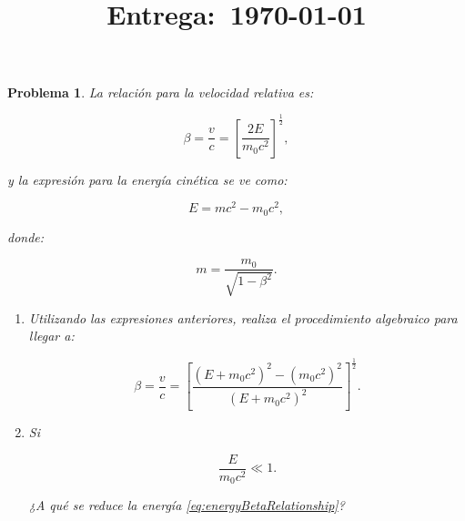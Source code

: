 \documentclass[12pt]{article}
\title{
    \textbf{\homeworknumber}\\
    \normalsize\vspace{0.1in}\small{\textbf{Entrega}:~\today}
    \vspace{-1.5in}
}
\author{}
\date{}
\theoremstyle{break}
\newtheorem{exercise}{Problema}
\theoremstyle{nonumberbreak}
\begin{document}
    \maketitle
    \thispagestyle{fancy}

    \begin{exercise}
      La relación para la velocidad relativa es:

      \begin{equation}
        \beta = \dfrac{v}{c} = \left[\dfrac{2E}{m_{0}c^{2}}\right]^{\frac{1}{2}},
      \end{equation}

      y la expresión para la energía cinética se ve como:

      \begin{equation}
        E = mc^{2} - m_{0}c^{2},
      \end{equation}

      donde:

      \begin{equation}
        m = \dfrac{m_{0}}{\sqrt{1 - \beta^{2}}}.
      \end{equation}

      \begin{enumerate}[label = \alph*)]
        \item Utilizando las expresiones anteriores, realiza el procedimiento algebraico para llegar a:
        
        \begin{equation}
          \beta = \dfrac{v}{c} = \left[\dfrac{(E + m_{0}c^{2})^{2} - (m_{0}c^{2})^{2}}{(E + m_{0}c^{2})^{2}}\right]^{\frac{1}{2}}.
          \label{eq:energyBetaRelationship}
        \end{equation}

        \item Si
        
        \begin{equation}
          \dfrac{E}{m_{0}c^{2}} \ll 1.
        \end{equation}

        ¿A qué se reduce la energía \cref{eq:energyBetaRelationship}?
      \end{enumerate}
    \end{exercise}
\end{document}

